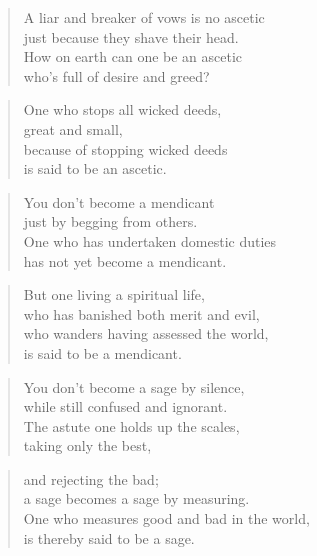 \documentclass[12pt,openany]{book}%
\begin{document}
\begin{verse}%
A liar and breaker of vows is no ascetic \\
just because they shave their head. \\
How on earth can one be an ascetic \\
who’s full of desire and greed? 

%
\end{verse}

\begin{verse}%
One who stops all wicked deeds, \\
great and small, \\
because of stopping wicked deeds \\
is said to be an ascetic. 

%
\end{verse}

\begin{verse}%
You don’t become a mendicant \\
just by begging from others. \\
One who has undertaken domestic duties \\
has not yet become a mendicant. 

%
\end{verse}

\begin{verse}%
But one living a spiritual life, \\
who has banished both merit and evil, \\
who wanders having assessed the world, \\
is said to be a mendicant. 

%
\end{verse}

\begin{verse}%
You don’t become a sage by silence, \\
while still confused and ignorant. \\
The astute one holds up the scales, \\
taking only the best, 

%
\end{verse}

\begin{verse}%
and rejecting the bad; \\
a sage becomes a sage by measuring. \\
One who measures good and bad in the world, \\
is thereby said to be a sage. 

%
\end{verse}
\end{document}

